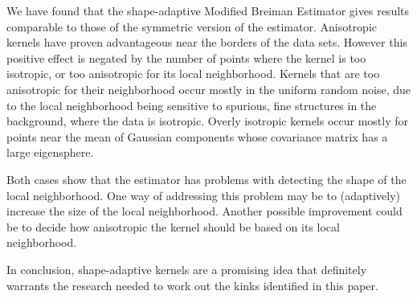 
We have found that the shape-adaptive Modified Breiman Estimator gives results comparable to those of the symmetric version of the estimator.
Anisotropic kernels have proven advantageous near the borders of the data sets. However this positive effect is negated by the number of points where the kernel is too isotropic, or too anisotropic for its local neighborhood. 
	Kernels that are too anisotropic for their neighborhood occur mostly in the uniform random noise, due to the local neighborhood being sensitive to spurious, fine structures in the background, where the data is isotropic. 
	Overly isotropic kernels occur mostly for points near the mean of Gaussian components whose covariance matrix has a large eigensphere. 

Both cases show that the estimator has problems with detecting the shape of the local neighborhood. One way of addressing this problem may be to (adaptively) increase the size of the local neighborhood. Another possible improvement could be to decide how anisotropic the kernel should be based on its local neighborhood.

In conclusion, shape-adaptive kernels are a promising idea that definitely warrants the research needed to work out the kinks identified in this paper.